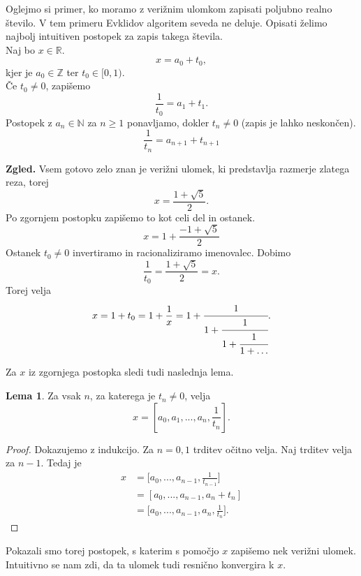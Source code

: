 \documentclass[a4paper,12pt]{article}
\newcommand{\N}{\mathbb{N}}
\newcommand{\R}{\mathbb{R}}
\newcommand{\Z}{\mathbb{Z}}
\theoremstyle{definition}
\theoremstyle{proposition}
\theoremstyle{theorem}
\theoremstyle{lemma}
\newtheorem{lem}{Lema}[section]
\begin{document}
Oglejmo si primer, ko moramo z verižnim ulomkom zapisati poljubno realno število. V tem primeru Evklidov algoritem seveda ne deluje. Opisati želimo najbolj intuitiven postopek za zapis takega števila.\\
\vspace{5mm}
Naj bo $x \in \R$.
\[ x = a_0+t_0, \]
kjer je $a_0 \in \Z$ ter $t_0 \in [0,1)$.\\
Če $t_0 \neq 0$, zapišemo \[ \frac{1}{t_0} = a_1 + t_1. \]
Postopek z $a_n \in \N$ za $n \geq 1$ ponavljamo, dokler $t_n \neq 0$ (zapis je lahko neskončen).
\[ \frac{1}{t_n} = a_{n+1}+t_{n+1} \] \vspace{5mm}

\textbf{Zgled.} Vsem gotovo zelo znan je verižni ulomek, ki predstavlja razmerje zlatega reza, torej \[x = \frac{1+\sqrt{5}}{2}. \] Po zgornjem postopku zapišemo to kot celi del in ostanek. \[x = 1 +\frac{-1+\sqrt{5}}{2} \] Ostanek $t_0 \neq 0$ invertiramo in racionaliziramo imenovalec. Dobimo \[\frac{1}{t_0} =\frac{1+\sqrt{5}}{2} = x. \] Torej velja \[x = 1 + t_0 = 1 + \frac{1}{x} = 1 + \cfrac{1}{1+\cfrac{1}{1+\cfrac{1}{1+\ldots}}}.\]

Za $x$ iz zgornjega postopka sledi tudi naslednja lema.

\begin{lem}
\label{lema}
Za vsak $n$, za katerega je $t_n \neq 0$, velja
\[ x=[a_0, a_1, ..., a_n, \frac{1}{t_n}]. \]
\end{lem}
\begin{proof}
Dokazujemo z indukcijo. Za $n=0,1$ trditev očitno velja. Naj trditev velja za $n-1$. Tedaj je
\begin{equation}
\begin{split}
x &= \big[a_0,...,a_{n-1},\frac{1}{t_{n-1}}\big] \\
&= [a_0,...,a_{n-1}, a_n + t_n] \\
&= \big[a_0, ...,a_{n-1}, a_n, \frac{1}{t_n}\big].
\end{split}
\end{equation}
\end{proof}

Pokazali smo torej postopek, s katerim s pomočjo $x$ zapišemo nek verižni ulomek. Intuitivno se nam zdi, da ta ulomek tudi resnično konvergira k $x$.
\end{document}
